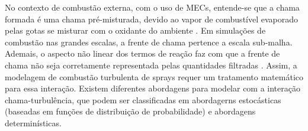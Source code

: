 

No contexto de combustão externa, com o uso de MECs, entende-se que a chama formada é uma chama pré-misturada, devido ao vapor de combustível evaporado pelas gotas se misturar com o oxidante do ambiente \cite{PoinsotVeynante2005}.
Em simulações de combustão nas grandes escalas, a frente de chama pertence a escala sub-malha.
Ademais, o aspecto não linear dos termos de reação faz com que a frente de chama não seja corretamente representada pelas quantidades filtradas \cite{SacomanoF2017PhD}.
Assim, a modelagem de combustão turbulenta de sprays requer um tratamento matemático para essa interação.
Existem diferentes abordagens para modelar com a interação chama-turbulência, que podem ser classificadas em abordagerns estocásticas (baseadas em funções de distribuição de probabilidade) e abordagens determinísticas.

